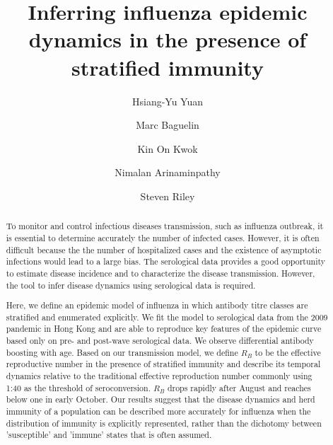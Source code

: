 \documentclass{article}
\begin{document}
\title{Inferring influenza epidemic dynamics in the presence of stratified immunity}
\author[1]{Hsiang-Yu Yuan}
\author[2]{Marc Baguelin}
\author[3]{Kin On Kwok}
\author[4]{Nimalan Arinaminpathy}
\author[1]{Steven Riley}
\maketitle

%
%
\nocite{*}


\doublespacing
\begin{abstract}
To monitor and control infectious diseases transmission, such as influenza outbreak, it is essential to determine accurately the number of infected cases. However, it is often difficult because the the number of hospitalized cases and the existence of asymptotic infections would lead to a large bias. The serological data provides a good opportunity to estimate disease incidence and to characterize the disease transmission. However, the tool to infer disease dynamics using serological data is required.

Here, we define an epidemic model of influenza in which antibody titre classes are stratified and enumerated explicitly. We fit the model to serological data from the 2009 pandemic in Hong Kong and are able to reproduce key features of the epidemic curve based only on pre- and post-wave serological data. We observe differential antibody boosting with age. Based on our transmission model, we define $R_{B}$ to be the effective reproductive number in the presence of stratified immunity and describe its temporal dynamics relative to the traditional effective reproduction number commonly using 1:40 as the threshold of seroconversion. $R_{B}$ drops rapidly after August and reaches below one in early October. Our results suggest that the disease dynamics and herd immunity of a population can be described more accurately for influenza when the distribution of immunity is explicitly represented, rather than the dichotomy between 'susceptible' and 'immune' states that is often assumed.

\end{abstract}
\end{document}
